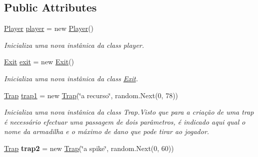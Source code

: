 \subsection*{Public Attributes}
\begin{DoxyCompactItemize}
\item 
\mbox{\hyperlink{class_projeto2___l_p1_1_1_player}{Player}} \mbox{\hyperlink{class_projeto2___l_p1_1_1_initializer_a15256baa4576459e5d15eb305e46cb1c}{player}} = new \mbox{\hyperlink{class_projeto2___l_p1_1_1_player}{Player}}()
\begin{DoxyCompactList}\small\item\em Inicializa uma nova instânica da class player. \end{DoxyCompactList}\item 
\mbox{\hyperlink{class_projeto2___l_p1_1_1_exit}{Exit}} \mbox{\hyperlink{class_projeto2___l_p1_1_1_initializer_a659e31f7b56c02922edc81ca6edd550c}{exit}} = new \mbox{\hyperlink{class_projeto2___l_p1_1_1_exit}{Exit}}()
\begin{DoxyCompactList}\small\item\em Inicializa uma nova instânica da class \mbox{\hyperlink{class_projeto2___l_p1_1_1_exit}{Exit}}. \end{DoxyCompactList}\item 
\mbox{\hyperlink{class_projeto2___l_p1_1_1_trap}{Trap}} \mbox{\hyperlink{class_projeto2___l_p1_1_1_initializer_a52528b8ea22dc356f6f3ea0a91e60d2d}{trap1}} = new \mbox{\hyperlink{class_projeto2___l_p1_1_1_trap}{Trap}}(\char`\"{}a recurso\char`\"{}, random.\+Next(0, 78))
\begin{DoxyCompactList}\small\item\em Inicializa uma nova instânica da class Trap.\+Visto que para a criação de uma trap é necessário efectuar uma passagem de dois parâmetros, é indicado aqui qual o nome da armadilha e o máximo de dano que pode tirar ao jogador. \end{DoxyCompactList}\item 
\mbox{\label{class_projeto2___l_p1_1_1_initializer_ad694a409f4dfefbe8f3e86db17c15b23}} 
\mbox{\hyperlink{class_projeto2___l_p1_1_1_trap}{Trap}} {\bfseries trap2} = new \mbox{\hyperlink{class_projeto2___l_p1_1_1_trap}{Trap}}(\char`\"{}a spike\char`\"{}, random.\+Next(0, 60))
\item 
\mbox{\label{class_projeto2___l_p1_1_1_initializer_a2d8c2cd6ef718180b828b10d6e9643ff}} 

\end{DoxyCompactItemize}
